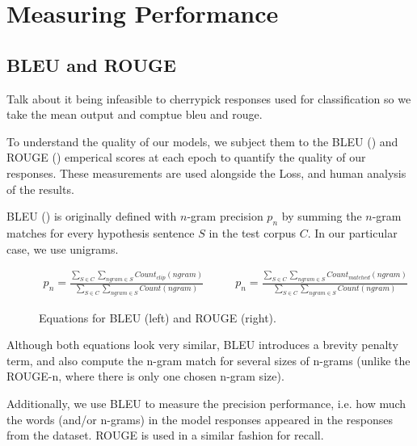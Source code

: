 \documentclass[12pt,twoside]{report}
\begin{document}
\section{Measuring Performance}


\subsection{BLEU and ROUGE}

Talk about it being infeasible to cherrypick responses used for classification so we take the mean output and comptue bleu and rouge.

To understand the quality of our models, we subject them to the BLEU (\cite{papineni_bleu:_2001}) and ROUGE (\cite{lin_rouge:_2004}) emperical scores at each epoch to quantify the quality of our responses. These measurements are used alongside the Loss, and human analysis of the results.

BLEU (\cite{papineni_bleu:_2001}) is originally defined with $n$-gram precision $p_n$ by summing the $n$-gram matches for every hypothesis sentence $S$ in the test corpus $C$. In our particular case, we use unigrams.

\begin{figure}[!ht]
	\begin{equation}
		\begin{split}
			p_n = \frac
			{\sum_{S\in C} \sum_{ngram\in S} Count_{clip}(ngram)}
			{\sum_{S\in C} \sum_{ngram\in S} Count(ngram)}
		\end{split}
		\quad\quad
		\begin{split}
			p_n = \frac
			{\sum_{S\in C} \sum_{ngram\in S} Count_{matched}(ngram)}
			{\sum_{S\in C} \sum_{ngram\in S} Count(ngram)}
		\end{split}
	\end{equation}
	\caption{Equations for BLEU (left) and ROUGE (right).}
	\end{figure}


Although both equations look very similar, BLEU introduces a brevity penalty term, and also compute the n-gram match for several sizes of n-grams (unlike the ROUGE-n, where there is only one chosen n-gram size). 

Additionally, we use BLEU to measure the precision performance, i.e. how much the words (and/or n-grams) in the model responses appeared in the responses from the dataset. ROUGE is used in a similar fashion for recall.
\end{document}
